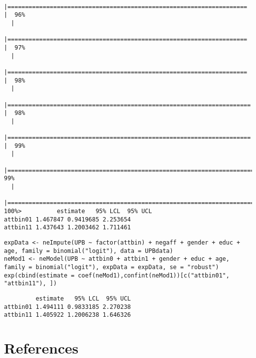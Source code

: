 \documentclass[12pt]{article}
\begin{document}
\begin{verbatim}
  |====================================================================  |  96%
  |                                                                            
  |====================================================================  |  97%
  |                                                                            
  |====================================================================  |  98%
  |                                                                            
  |===================================================================== |  98%
  |                                                                            
  |===================================================================== |  99%
  |                                                                            
  |======================================================================|  99%
  |                                                                            
  |======================================================================| 100%>          estimate   95% LCL  95% UCL
attbin01 1.467847 0.9419685 2.253654
attbin11 1.437643 1.2003462 1.711461
\end{verbatim}


\lstset{language=r,label= ,caption= ,captionpos=b,numbers=none}
\begin{lstlisting}
expData <- neImpute(UPB ~ factor(attbin) + negaff + gender + educ + age, family = binomial("logit"), data = UPBdata)
neMod1 <- neModel(UPB ~ attbin0 + attbin1 + gender + educ + age, family = binomial("logit"), expData = expData, se = "robust")
exp(cbind(estimate = coef(neMod1),confint(neMod1))[c("attbin01", "attbin11"), ])
\end{lstlisting}

\begin{verbatim}
         estimate   95% LCL  95% UCL
attbin01 1.494111 0.9833185 2.270238
attbin11 1.405922 1.2006238 1.646326
\end{verbatim}

\section{References}
\label{sec:org4ba5dec}
\begingroup
\renewcommand{\section}[2]{}



\endgroup
\end{document}
